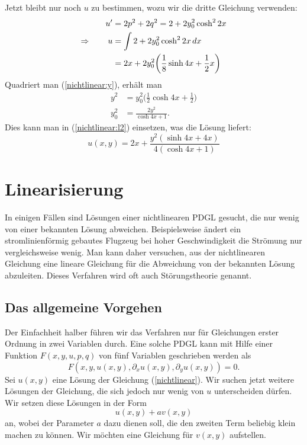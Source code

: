 Jetzt bleibt nur noch $u$ zu bestimmen, wozu wir die dritte Gleichung
verwenden:
\begin{align}
u'&=2p^2+2q^2=
2 + 2y_0^2\cosh^22x
\notag
\\
\Rightarrow\qquad
u&=\int
2 + 2y_0^2\cosh^22x
\,dx
\notag
\\
&=2x +2y_0^2\biggl(\frac18\sinh 4x+\frac12x\biggr)
\label{nichtlinear:l2}
\end{align}
Quadriert man (\ref{nichtlinear:y}), erhält man
\begin{align*}
y^2
&=
y_0^2\biggl(\frac12\cosh 4x+\frac12\biggr)
\\
y_0^2&=\frac{2y^2}{\cosh4x + 1}.
\end{align*}
Dies kann man in (\ref{nichtlinear:l2}) einsetzen, was die Lösung
liefert:
\begin{equation}
u(x,y)
=
2x+\frac{y^2(\sinh4x+4x)}{4(\cosh4x+1)}
\label{nichtlinear:loesung}
\end{equation}

\section{Linearisierung}
In einigen Fällen sind Lösungen einer nichtlinearen PDGL gesucht, die 
nur wenig von einer bekannten Lösung abweichen. Beispielsweise ändert
ein stromlinienförmig gebautes Flugzeug bei hoher Geschwindigkeit die
Strömung nur vergleichsweise wenig. Man kann daher versuchen, aus der
nichtlinearen Gleichung eine lineare Gleichung für die Abweichung
von der bekannten Lösung abzuleiten. Dieses Verfahren wird oft auch
Störungstheorie genannt.

\subsection{Das allgemeine Vorgehen}
Der Einfachheit halber führen wir das Verfahren nur für Gleichungen
erster Ordnung in zwei Variablen durch. Eine solche PDGL kann mit Hilfe
einer Funktion $F(x,y,u,p,q)$ von fünf Variablen geschrieben werden als
\begin{equation}
F(x,y,u(x,y), \partial_xu(x,y),\partial_yu(x,y))=0.
\label{nichtlinear}
\end{equation}
Sei $u(x,y)$ eine Lösung der Gleichung (\ref{nichtlinear}). Wir suchen
jetzt weitere Lösungen der Gleichung, die sich jedoch nur wenig von
$u$ unterscheiden dürfen. Wir setzen diese Lösungen in der Form
\begin{equation}
u(x,y)+av(x,y)
\label{linearisierungansatz}
\end{equation}
an, wobei der Parameter $a$ dazu dienen soll, die den
zweiten Term beliebig klein machen zu können. Wir möchten eine Gleichung
für $v(x,y)$ aufstellen.

